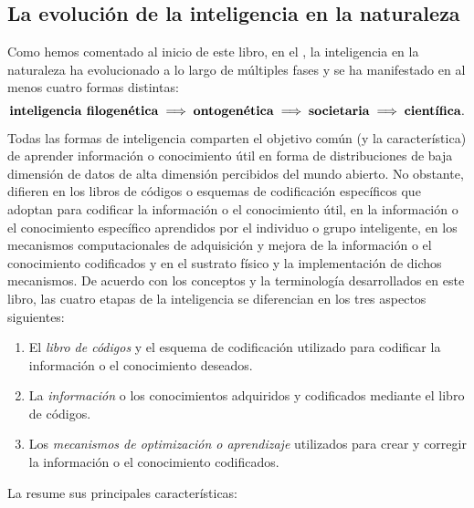 \documentclass[../../book-main_es.tex]{subfiles}
\begin{document}
\subsection{La evolución de la inteligencia en la naturaleza}
Como hemos comentado al inicio de este libro, en el ,
la inteligencia en la naturaleza ha evolucionado a lo largo de múltiples fases y
se ha manifestado en al menos cuatro formas distintas:
\begin{equation}
    \text{\textbf{inteligencia filogenética}} \;
    \Longrightarrow \; \text{\textbf{ontogenética}} \;
    \Longrightarrow \; \text{\textbf{societaria}} \;
    \Longrightarrow \; \text{\textbf{científica}}.
\end{equation}
Todas las formas de inteligencia comparten el objetivo común (y la característica) de 
aprender información o conocimiento útil en forma de distribuciones de baja dimensión de 
datos de alta dimensión percibidos del mundo abierto. No obstante, difieren en los 
libros de códigos o esquemas de codificación específicos que adoptan para codificar 
la información o el conocimiento útil, en la información o el conocimiento específico 
aprendidos por el individuo o grupo inteligente, en los mecanismos computacionales de adquisición y mejora 
de la información o el conocimiento codificados y en el sustrato físico y la implementación 
de dichos mecanismos. De acuerdo con los conceptos y la terminología desarrollados en este 
libro, las cuatro etapas de la inteligencia se diferencian en los tres aspectos siguientes:
\begin{enumerate}
    \item El \textit{libro de códigos} y el esquema de codificación utilizado para codificar la
        información o el conocimiento deseados.
    \item La \textit{información} o los conocimientos adquiridos y codificados
        mediante el libro de códigos.
    \item Los \textit{mecanismos de optimización o aprendizaje} utilizados para crear y
        corregir la información o el conocimiento codificados.
\end{enumerate}
La  resume sus principales características:
\end{document}
